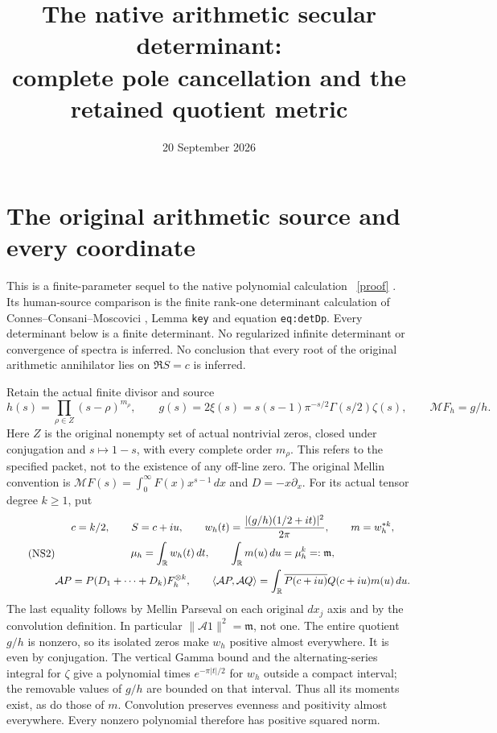 \documentclass[11pt]{article}
\title{The native arithmetic secular determinant:\\
complete pole cancellation and the retained quotient metric}
\author{}\date{20 September 2026}
\begin{document}
\maketitle

\section{The original arithmetic source and every coordinate}

This is a finite-parameter sequel to the native polynomial calculation
\cite{Native}%
~\href{https://github.com/KokunoYumeto/zeta-function-research-reader/blob/5992ad50c0f2a06921f1fcaded7b4e38097c0739/workbenches/splitzero-tandem/continuations/20260920-original-kernel-mixed-determinants/providers/NATIVE_PROLATE_LIE_DEFECT.tex\#L1}{[proof]}%
{}. Its human-source comparison is the finite rank-one
determinant calculation of Connes--Consani--Moscovici \cite{CCM},
Lemma \texttt{key} and equation \texttt{eq:detDp}.
Every determinant below is a finite determinant. No regularized
infinite determinant or convergence of spectra is inferred.
No conclusion that every root of the original arithmetic
annihilator lies on $\Re S=c$ is inferred.

Retain the actual finite divisor and source
\begin{equation}\tag{NS1}\label{NS1}
h(s)=\prod_{\rho\in Z}(s-\rho)^{m_\rho},\qquad
g(s)=2\xi(s)=s(s-1)\pi^{-s/2}\Gamma(s/2)\zeta(s),\qquad
\mathcal M F_h=g/h.
\end{equation}
Here $Z$ is the original nonempty set of actual nontrivial zeros,
closed under conjugation and $s\mapsto1-s$, with every complete
order $m_\rho$. This refers to the specified packet, not to the
existence of any off-line zero. The original Mellin convention is
$\mathcal M F(s)=\int_0^\infty F(x)x^{s-1}\,dx$ and $D=-x\partial_x$.
For its actual tensor degree $k\geq1$, put
\begin{equation}\tag{NS2}\label{NS2}
\begin{gathered}
c=k/2,\qquad S=c+iu,\qquad
w_h(t)=\frac{|(g/h)(1/2+it)|^2}{2\pi},\qquad m=w_h^{*k},\\
\mu_h=\int_\mathbb R w_h(t)\,dt,\qquad
\int_\mathbb R m(u)\,du=\mu_h^k=:\mathfrak m,\\
\mathcal A P=P(D_1+\cdots+D_k)F_h^{\otimes k},\qquad
\langle\mathcal A P,\mathcal A Q\rangle
 =\int_\mathbb R\overline{P(c+iu)}Q(c+iu)m(u)\,du .
\end{gathered}
\end{equation}
The last equality follows by Mellin Parseval on each original
$dx_j$ axis and by the convolution definition. In particular
$\|\mathcal A1\|^2=\mathfrak m$, not one.
The entire quotient $g/h$ is nonzero, so its isolated zeros make
$w_h$ positive almost everywhere. It is even by conjugation.
The vertical Gamma bound and the alternating-series integral for
$\zeta$ give a polynomial times $e^{-\pi|t|/2}$ for $w_h$ outside
a compact interval; the removable values of $g/h$ are bounded on
that interval. Thus all its moments exist, as do those of $m$.
Convolution preserves evenness and positivity almost everywhere.
Every nonzero polynomial therefore has positive squared norm.
\end{document}
